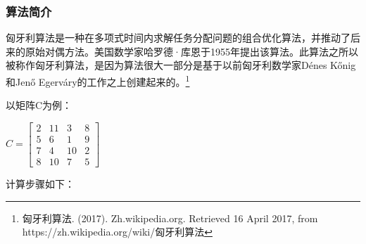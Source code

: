 \subsubsection{算法简介}
匈牙利算法是一种在多项式时间内求解任务分配问题的组合优化算法，并推动了后来的原始对偶方法。美国数学家哈罗德·库恩于1955年提出该算法。此算法之所以被称作匈牙利算法，是因为算法很大一部分是基于以前匈牙利数学家Dénes Kőnig和Jenő Egerváry的工作之上创建起来的。\footnote{匈牙利算法. (2017). Zh.wikipedia.org. Retrieved 16 April 2017, from https://zh.wikipedia.org/wiki/匈牙利算法}\par
以矩阵C为例：\par
$
C =
\begin{bmatrix}
	2 & 11 & 3 & 8 \\
	5 & 6 & 1 & 9 \\
	7 & 4 & 10 & 2 \\
	8 & 10 & 7 & 5
\end{bmatrix}
$ \par
计算步骤如下：
